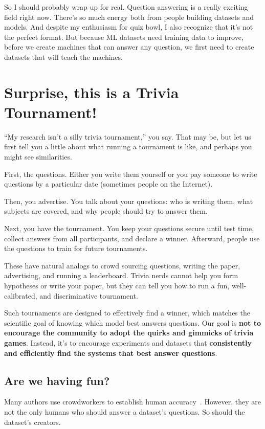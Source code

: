 So I should probably wrap up for real. Question answering is a really exciting field right now. There’s so much energy both from people building datasets and models. And despite my enthusiasm for quiz bowl, I also recognize that it’s not the perfect format.  But because ML datasets need training data to improve, before we create machines that can answer any question, we first need to create datasets that will teach the machines.

\section{Surprise, this is a Trivia Tournament!}
\label{sec:tournament}


``My research isn't a silly trivia tournament,'' you say.
That may be, but let us first tell you a little about what running a tournament is like, and perhaps you might see similarities.


First, the questions.
Either you write them yourself or you pay someone to write questions by a particular date (sometimes people on the Internet). 

Then, you advertise.  
You talk about your questions:
who is writing them, what subjects are covered, and why people should try to answer them.

Next, you have the tournament. 
You keep your questions secure until test time, collect answers from all participants, and declare a winner. 
Afterward, people use the questions to train for future tournaments.

These have natural analogs to crowd sourcing questions, writing the paper, advertising, and running a leaderboard. 
Trivia nerds cannot help you form hypotheses or write your paper, but they can tell you how to run a fun, well-calibrated, and discriminative tournament.

Such tournaments are designed to effectively find a winner, which matches the scientific goal of knowing which model best answers questions.
Our goal is {\bf not to encourage the  community to adopt the quirks and gimmicks of trivia games}.
Instead, it's to encourage experiments and datasets that {\bf consistently and efficiently find the systems that best answer questions}.

\subsection{Are we having fun?}
\label{sec:fun}

Many authors use crowdworkers to establish human accuracy~\citep{rajpurkar-16,choi-18}.
However, they are not the only humans who should answer a dataset's questions.
So should the dataset's creators.

